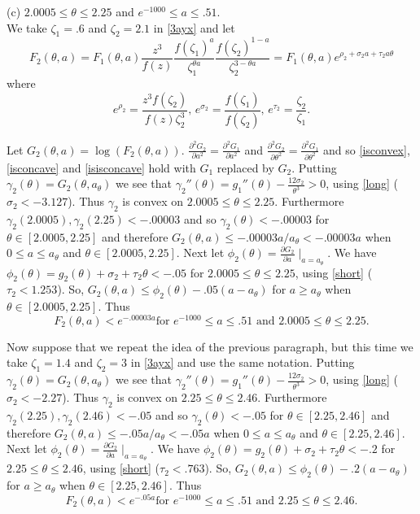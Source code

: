 \documentclass[11pt]{article}
\def\f{\phi}
\def\g{\gamma}
\def\z{\zeta}
\def\th{\theta}
\def\r{\rho}
\def\s{\sigma}
\def\t{\tau}
\begin{document}
(c) $2.0005\leq \th\leq 2.25$ and $e^{-1000}\leq a\leq .51$.\\
We take $\z_1=.6$ and $\z_2=2.1$ in \eqref{3ayx} and let
$$F_2(\th,a)=F_1(\th,a)\frac{z^3}{f(z)}\frac{f(\z_1)^a}{\z_1^{\th a}}
\frac{f(\z_2)^{1-a}}{\z_2^{3-\th a}}=F_1(\th,a)e^{\r_2+\s_2 a+\t_2a\th}$$
where 
$$e^{\r_2}=\frac{z^3f(\z_2)}{f(z)\z_2^3},\,e^{\s_2}=\frac{f(\z_1)}{f(\z_2)},\,e^{\t_2}=\frac{\z_2}{\z_1}.$$

Let $G_2(\th,a)=\log(F_2(\th,a))$. $\frac{\partial^2G_2}{\partial a^2}=\frac{\partial^2G_1}{\partial a^2}$
and $\frac{\partial^2G_2}{\partial \th^2}=\frac{\partial^2G_1}{\partial \th^2}$
and so \eqref{isconvex},\eqref{isconcave} and \eqref{isisconcave} hold with $G_1$ replaced by $G_2$. 
Putting $\g_2(\th)=G_2(\th,a_\th)$ we see that $\g_2''(\th)=g_1''(\th)-\frac{12\s_2}{\th^3}>0$,
using \eqref{long} ($\s_2<-3.127$).
Thus $\g_2$ is convex on $2.0005\leq \th\leq
2.25$. Furthermore $\g_2(2.0005),\g_2(2.25)<-.00003$ and so $\g_2(\th)<-.00003$ for $\th\in [2.0005,2.25]$
and therefore $G_2(\th,a)\leq -.00003a/a_\th<-.00003a$ when $0\leq a\leq a_\th$ and $\th\in [2.0005,2.25]$.
Next let $\f_2(\th)=\frac{\partial G_2}{\partial a}\mid_{a=a_\th}$. We have $\f_2(\th)=g_2(\th)+\s_2+\t_2\th<-.05$ 
for $2.0005\leq \th\leq 2.25$, using \eqref{short} ($\t_2<1.253$). So,
$G_2(\th,a)\leq \f_2(\th)-.05(a-a_\th)$ for $a\geq a_\th$ when $\th\in [2.0005,2.25]$. Thus 
$$F_2(\th,a)<e^{-.00003a}\text{
for $e^{-1000}\leq a\leq .51$ and }2.0005\leq \th\leq 2.25.$$

Now suppose that we repeat the idea of the previous paragraph, but this time we take $\z_1=1.4$ and $\z_2=3$ in \eqref{3ayx}
and use the same notation. Putting $\g_2(\th)=G_2(\th,a_\th)$ we see that $\g_2''(\th)=g_1''(\th)-\frac{12\s_2}{\th^3}>0$,
using \eqref{long} ($\s_2<-2.27$).
Thus $\g_2$ is convex on $2.25\leq \th\leq
2.46$. Furthermore $\g_2(2.25),\g_2(2.46)<-.05$ and so $\g_2(\th)<-.05$ for $\th\in [2.25,2.46]$
and therefore $G_2(\th,a)\leq -.05a/a_\th<-.05a$ when $0\leq a\leq a_\th$ and $\th\in [2.25,2.46]$.
Next let $\f_2(\th)=\frac{\partial G_2}{\partial a}\mid_{a=a_\th}$. We have $\f_2(\th)=g_2(\th)+\s_2+\t_2\th<-.2$ 
for $2.25\leq \th\leq 2.46$, using \eqref{short} ($\t_2<.763$). So,
$G_2(\th,a)\leq \f_2(\th)-.2(a-a_\th)$ for $a\geq a_\th$ when $\th\in [2.25,2.46]$. Thus 
$$F_2(\th,a)<e^{-.05a}\text{
for $e^{-1000}\leq a\leq .51$ and }2.25\leq \th\leq 2.46.$$
\end{document}
